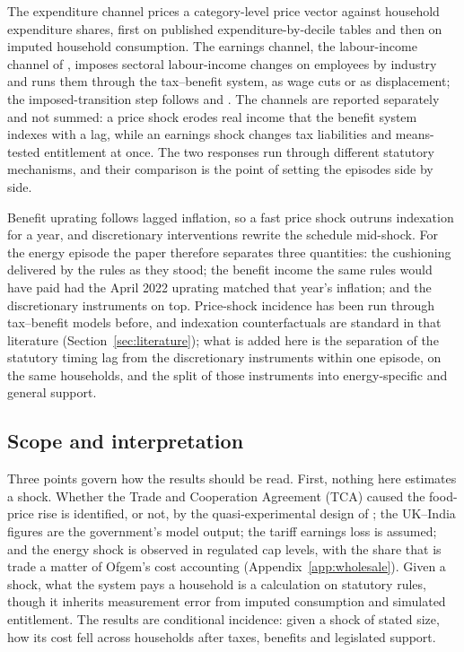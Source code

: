 The expenditure channel prices a category-level price vector against
household expenditure shares, first on published
expenditure-by-decile tables and then on imputed household
consumption. The earnings channel, the labour-income channel of
\citet{porto2006}, imposes sectoral labour-income changes on
employees by industry and runs them through the tax--benefit system,
as wage cuts or as displacement; the imposed-transition step follows
\citet{brewertasseva2021} and \citet{navicke2014}. The channels are
reported separately and not summed: a price shock erodes real income
that the benefit system indexes with a lag, while an earnings shock
changes tax liabilities and means-tested entitlement at once. The two
responses run through different statutory mechanisms, and their
comparison is the point of setting the episodes side by side.

Benefit uprating follows lagged inflation, so a fast price shock
outruns indexation for a year, and discretionary interventions rewrite
the schedule mid-shock. For the energy episode the paper therefore
separates three quantities: the cushioning delivered by the rules as
they stood; the benefit income the same rules would have paid had the
April 2022 uprating matched that year's inflation; and the
discretionary instruments on top. Price-shock incidence has been run
through tax--benefit models before, and indexation counterfactuals are
standard in that literature (Section~\ref{sec:literature}); what is
added here is the separation of the statutory timing lag from the
discretionary instruments within one episode, on the same households,
and the split of those instruments into energy-specific and general
support.

\subsection{Scope and interpretation}\label{sec:framework-ident}\label{sec:framework-decile}

Three points govern how the results should be read. First, nothing
here estimates a shock. Whether the Trade and Cooperation Agreement (TCA) caused the food-price rise is identified, or not, by the
quasi-experimental design of \citet{bakker2023}; the UK--India figures
are the government's model output; the tariff earnings loss is
assumed; and the energy shock is observed in regulated cap levels,
with the share that is trade a matter of Ofgem's cost accounting
(Appendix~\ref{app:wholesale}). Given a shock, what the system pays a
household is a calculation on statutory rules, though it inherits
measurement error from imputed consumption and simulated entitlement.
The results are conditional incidence: given a shock of stated size,
how its cost fell across households after taxes, benefits and
legislated support.

